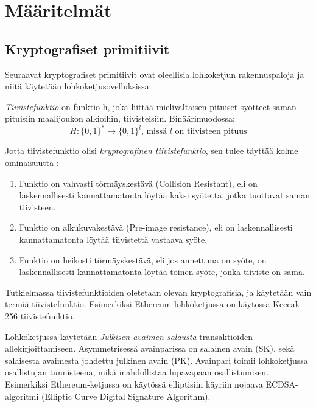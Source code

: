 \chapter{Määritelmät\label{methods}}

\section{Kryptografiset primitiivit}

Seuraavat kryptografiset primitiivit ovat oleellisia lohkoketjun rakennuspaloja ja niitä käytetään lohkoketjusovelluksissa.

\textit{Tiivistefunktio} on funktio h, joka liittää mielivaltaisen pituiset syötteet saman pituisiin maalijoukon alkioihin, tiivisteisiin. Binäärimuodossa: 
\begin{equation}
    H : \{0, 1\}^* \longrightarrow  \{0, 1\}^l \text{, missä $l$ on tiivisteen pituus}
\end{equation}

Jotta tiivistefunktio olisi \textit{kryptografinen tiivistefunktio}, sen tulee täyttää kolme ominaisuutta \cite{cryptoeprint:2011:565}: 
\begin{enumerate}
    \item Funktio on vahvasti törmäyskestävä (Collision Resistant), eli on laskennallisesti kannattamatonta löytää kaksi syötettä, jotka tuottavat saman tiivisteen.
    \item Funktio on alkukuvakestävä (Pre-image resistance), eli on laskennallisesti kannattamatonta löytää tiivistettä vastaava syöte.
    \item Funktio on heikosti törmäyskestävä, eli jos annettuna on syöte, on laskennallisesti kannattamatonta löytää toinen syöte, jonka tiiviste on sama.
\end{enumerate}

Tutkielmassa tiivistefunktioiden oletetaan olevan kryptografisia, ja käytetään vain termiä tiivistefunktio. Esimerkiksi Ethereum-lohkoketjussa on käytössä Keccak-256 tiivistefunktio. 

Lohkoketjussa käytetään \textit{Julkisen avaimen salausta} transaktioiden allekirjoittamiseen. Asymmetrisessä avainparissa on salainen avain (SK), sekä salaisesta avaimesta johdettu julkinen avain (PK). Avainpari toimii lohkoketjussa osallistujan tunnisteena, mikä mahdollistaa lupavapaan osallistumisen. Esimerkiksi Ethereum-ketjussa on käytössä elliptisiin käyriin nojaava ECDSA-algoritmi (Elliptic Curve Digital Signature Algorithm). 

